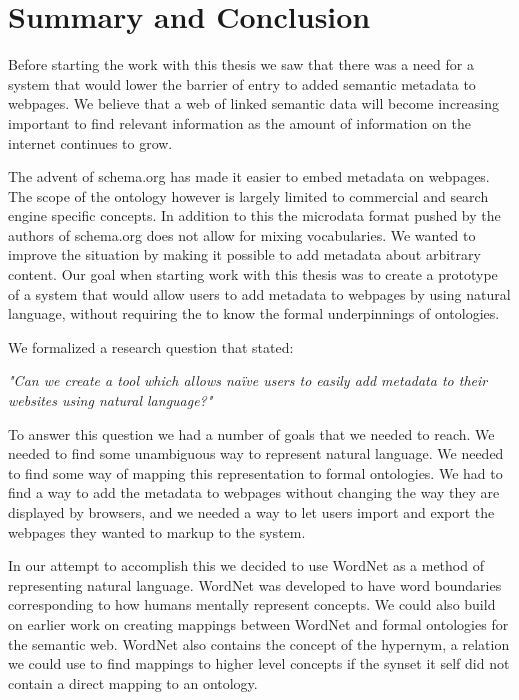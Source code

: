 
\chapter{Summary and Conclusion} %
\label{Conclusion} %
Before starting the work with this thesis we saw that there was a need for a system that would lower the barrier of
entry to added semantic metadata to webpages.
We believe that a web of linked semantic data will become increasing important to find relevant information as the amount
of information on the internet continues to grow.

The advent of schema.org has made it easier to embed metadata on webpages.
The scope of the ontology however is largely limited to commercial and search engine specific concepts.
In addition to this the microdata format pushed by the authors of schema.org does not allow for mixing vocabularies.
We wanted to improve the situation by making it possible to add metadata about arbitrary content.
Our goal when starting work with this thesis was to create a prototype of a system that would allow users to add metadata to webpages by using natural language,
without requiring the to know the formal underpinnings of ontologies.

We formalized a research question that stated:

\emph{"Can we create a tool which allows naïve users to easily add metadata to their websites using natural language?"}

To answer this question we had a number of goals that we needed to reach.
We needed to find some unambiguous way to represent natural language.
We needed to find some way of mapping this representation to formal ontologies.
We had to find a way to add the metadata to webpages without changing the way they are displayed by browsers,
and we needed a way to let users import and export the webpages they wanted to markup to the system.

In our attempt to accomplish this we decided to use WordNet as a method of representing natural language.
WordNet was developed to have word boundaries corresponding to how humans mentally represent concepts.
We could also build on earlier work on creating mappings between WordNet and formal ontologies for the semantic web.
WordNet also contains the concept of the hypernym, a relation we could use to find mappings to higher level concepts
if the synset it self did not contain a direct mapping to an ontology.

